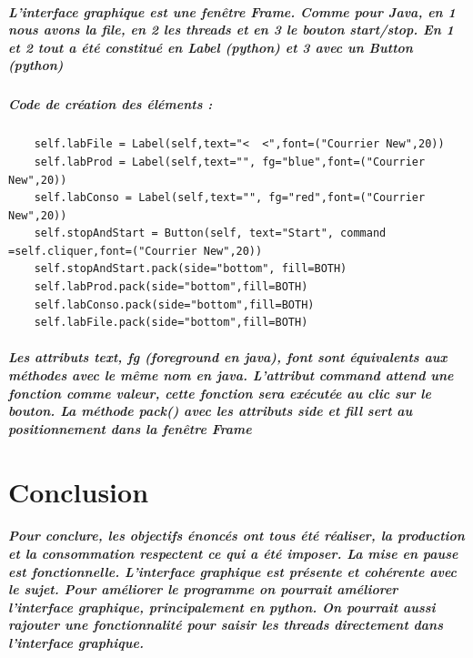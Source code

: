 \documentclass[a4paper]{report}
\begin{document}
\paragraph{
L'interface graphique est une fenêtre Frame. Comme pour Java, en 1 nous avons la file, en 2 les threads et en 3 le bouton start/stop. En 1 et 2 tout a été constitué en Label (python) et 3 avec un Button (python)}

\paragraph{Code de création des éléments :}

\begin{verbatim}
    self.labFile = Label(self,text="<  <",font=("Courrier New",20))
    self.labProd = Label(self,text="", fg="blue",font=("Courrier New",20))
    self.labConso = Label(self,text="", fg="red",font=("Courrier New",20))
    self.stopAndStart = Button(self, text="Start", command =self.cliquer,font=("Courrier New",20))
    self.stopAndStart.pack(side="bottom", fill=BOTH)
    self.labProd.pack(side="bottom",fill=BOTH)
    self.labConso.pack(side="bottom",fill=BOTH)
    self.labFile.pack(side="bottom",fill=BOTH)
\end{verbatim}

\paragraph{Les attributs text, fg (foreground en java), font sont équivalents aux méthodes avec le même nom en java. L'attribut command attend une fonction comme valeur, cette fonction sera exécutée au clic sur le bouton. La méthode pack() avec les attributs side et fill sert au positionnement dans la fenêtre Frame}


\chapter{Conclusion}

\paragraph{Pour conclure, les objectifs énoncés ont tous été réaliser, la production et la consommation respectent ce qui a été imposer. La mise en pause est fonctionnelle. L'interface graphique est présente et cohérente avec le sujet. Pour améliorer le programme on pourrait améliorer l'interface graphique, principalement en python. On pourrait aussi rajouter une fonctionnalité pour saisir les threads directement dans l'interface graphique. }
\end{document}
